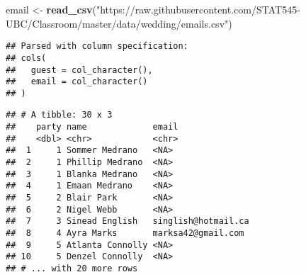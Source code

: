 \documentclass[]{article}
\newenvironment{Shaded}{\begin{snugshade}}{\end{snugshade}}
\newcommand{\KeywordTok}[1]{\textcolor[rgb]{0.13,0.29,0.53}{\textbf{#1}}}
\newcommand{\DataTypeTok}[1]{\textcolor[rgb]{0.13,0.29,0.53}{#1}}
\newcommand{\StringTok}[1]{\textcolor[rgb]{0.31,0.60,0.02}{#1}}
\newcommand{\CommentTok}[1]{\textcolor[rgb]{0.56,0.35,0.01}{\textit{#1}}}
\newcommand{\OperatorTok}[1]{\textcolor[rgb]{0.81,0.36,0.00}{\textbf{#1}}}
\newcommand{\NormalTok}[1]{#1}
\begin{document}
\begin{Shaded}
\begin{Highlighting}[]
\NormalTok{email <-}\StringTok{ }\KeywordTok{read_csv}\NormalTok{(}\StringTok{"https://raw.githubusercontent.com/STAT545-UBC/Classroom/master/data/wedding/emails.csv"}\NormalTok{)}
\end{Highlighting}
\end{Shaded}

\begin{verbatim}
## Parsed with column specification:
## cols(
##   guest = col_character(),
##   email = col_character()
## )
\end{verbatim}

\begin{Shaded}
\end{Shaded}

\begin{verbatim}
## # A tibble: 30 x 3
##    party name             email              
##    <dbl> <chr>            <chr>              
##  1     1 Sommer Medrano   <NA>               
##  2     1 Phillip Medrano  <NA>               
##  3     1 Blanka Medrano   <NA>               
##  4     1 Emaan Medrano    <NA>               
##  5     2 Blair Park       <NA>               
##  6     2 Nigel Webb       <NA>               
##  7     3 Sinead English   singlish@hotmail.ca
##  8     4 Ayra Marks       marksa42@gmail.com 
##  9     5 Atlanta Connolly <NA>               
## 10     5 Denzel Connolly  <NA>               
## # ... with 20 more rows
\end{verbatim}

\begin{Shaded}
\end{Shaded}
\end{document}
